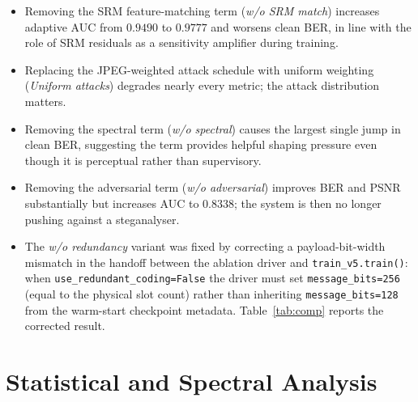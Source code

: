 \documentclass[journal]{IEEEtran}
\begin{document}
\begin{itemize}
    \item Removing the SRM feature-matching term (\emph{w/o SRM
    match}) increases adaptive AUC from $0.9490$ to $0.9777$ and
    worsens clean BER, in line with the role of SRM residuals as a
    sensitivity amplifier during training.
    \item Replacing the JPEG-weighted attack schedule with uniform
    weighting (\emph{Uniform attacks}) degrades nearly every
    metric; the attack distribution matters.
    \item Removing the spectral term (\emph{w/o spectral}) causes
    the largest single jump in clean BER, suggesting the term
    provides helpful shaping pressure even though it is perceptual
    rather than supervisory.
    \item Removing the adversarial term (\emph{w/o adversarial})
    improves BER and PSNR substantially but increases AUC to
    $0.8338$; the system is then no longer pushing against a
    steganalyser.
    \item The \emph{w/o redundancy} variant was fixed by correcting
    a payload-bit-width mismatch in the handoff between the ablation
    driver and \texttt{train\_v5.train()}: when \texttt{use\_redundant\_coding=False}
    the driver must set \texttt{message\_bits=256} (equal to the physical
    slot count) rather than inheriting \texttt{message\_bits=128} from the
    warm-start checkpoint metadata.  Table~\ref{tab:comp} reports the
    corrected result.
\end{itemize}

\begin{table}[t]
\centering
\caption{Short-run component ablations from the v5 branch. All
variants share the same warm start and $8\,\mathrm{k}$-step budget.}
\label{tab:comp}
\end{table}

\section{Statistical and Spectral Analysis}
\label{sec:security}
\end{document}
